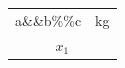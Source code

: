 \documentclass{article}
\newcommand{\unit}[1]{#1}
\begin{document}
\begin{tabular}{@{}p{3cm}c@{}}
\toprule
a\&\&b\%\%c&\unit{kg}\\
\multicolumn{2}{c}{$x_1$}\\
\bottomrule
\end{tabular}
\end{document}
